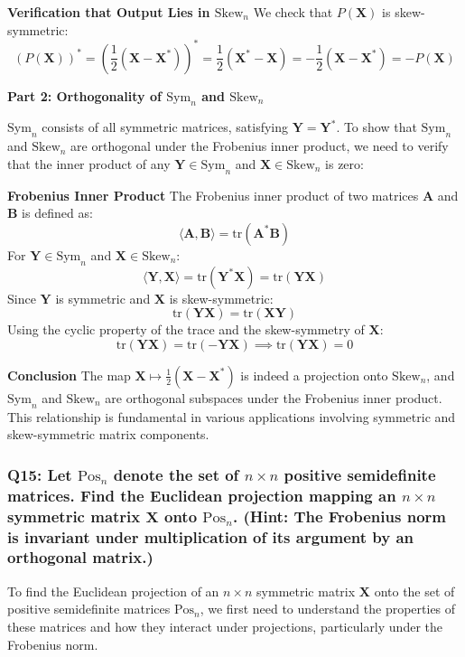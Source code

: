 \documentclass[8pt]{article}
\begin{document}
{\textbf{Verification that Output Lies in \(\mathrm{Skew}_n\)}
We check that \(P(\mathbf{X})\) is skew-symmetric:
\[
(P(\mathbf{X}))^* = \left(\frac{1}{2} (\mathbf{X} - \mathbf{X}^*)\right)^* = \frac{1}{2} (\mathbf{X}^* - \mathbf{X}) = -\frac{1}{2} (\mathbf{X} - \mathbf{X}^*) = -P(\mathbf{X})
\]

\textbf{Part 2: Orthogonality of \(\mathrm{Sym}_n\) and \(\mathrm{Skew}_n\)}

\(\mathrm{Sym}_n\) consists of all symmetric matrices, satisfying \(\mathbf{Y} = \mathbf{Y}^*\). To show that \(\mathrm{Sym}_n\) and \(\mathrm{Skew}_n\) are orthogonal under the Frobenius inner product, we need to verify that the inner product of any \(\mathbf{Y} \in \mathrm{Sym}_n\) and \(\mathbf{X} \in \mathrm{Skew}_n\) is zero:

\textbf{Frobenius Inner Product}
The Frobenius inner product of two matrices \(\mathbf{A}\) and \(\mathbf{B}\) is defined as:
\[
\langle \mathbf{A}, \mathbf{B} \rangle = \mathrm{tr}(\mathbf{A}^* \mathbf{B})
\]
For \(\mathbf{Y} \in \mathrm{Sym}_n\) and \(\mathbf{X} \in \mathrm{Skew}_n\):
\[
\langle \mathbf{Y}, \mathbf{X} \rangle = \mathrm{tr}(\mathbf{Y}^* \mathbf{X}) = \mathrm{tr}(\mathbf{Y} \mathbf{X})
\]
Since \(\mathbf{Y}\) is symmetric and \(\mathbf{X}\) is skew-symmetric:
\[
\mathrm{tr}(\mathbf{Y} \mathbf{X}) = \mathrm{tr}(\mathbf{X} \mathbf{Y})
\]
Using the cyclic property of the trace and the skew-symmetry of \(\mathbf{X}\):
\[
\mathrm{tr}(\mathbf{Y} \mathbf{X}) = \mathrm{tr}(-\mathbf{Y} \mathbf{X}) \implies \mathrm{tr}(\mathbf{Y} \mathbf{X}) = 0
\]

\textbf{Conclusion}
The map \(\mathbf{X} \mapsto \frac{1}{2} (\mathbf{X} - \mathbf{X}^*)\) is indeed a projection onto \(\mathrm{Skew}_n\), and \(\mathrm{Sym}_n\) and \(\mathrm{Skew}_n\) are orthogonal subspaces under the Frobenius inner product. This relationship is fundamental in various applications involving symmetric and skew-symmetric matrix components.

\subsubsection*{Q15: Let \(\mathrm{Pos}_n\) denote the set of \(n \times n\) positive semidefinite matrices. Find the Euclidean projection mapping an \(n \times n\) symmetric matrix \(\mathbf{X}\) onto \(\mathrm{Pos}_n\). (Hint: The Frobenius norm is invariant under multiplication of its argument by an orthogonal matrix.)}

To find the Euclidean projection of an \(n \times n\) symmetric matrix \(\mathbf{X}\) onto the set of positive semidefinite matrices \(\mathrm{Pos}_n\), we first need to understand the properties of these matrices and how they interact under projections, particularly under the Frobenius norm. 

}
\end{document}
